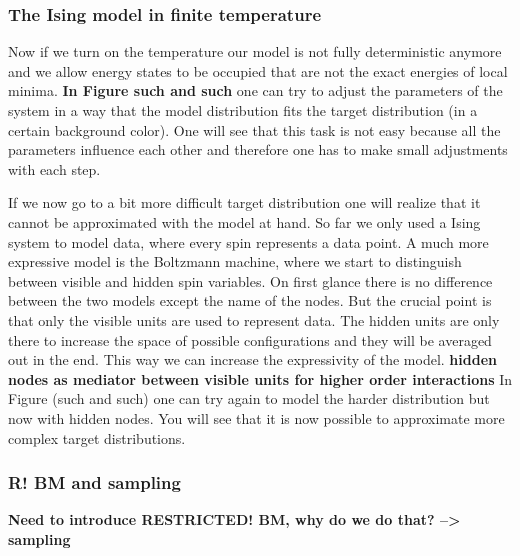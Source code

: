 \documentclass[nofootinbib, superscriptaddress, prl]{revtex4}
\begin{document}
\subsubsection{The Ising model in finite temperature}

Now if we turn on the temperature our model is not fully deterministic anymore and we allow energy states to be occupied that are not the exact energies of local minima.
\textbf{In Figure such and such } one can try to adjust the parameters of the system in a way that the model distribution fits the target distribution (in a certain background color). One will see that this task is not easy because all the parameters influence each other and therefore one has to make small adjustments with each step.

If we now go to a bit more difficult target distribution one will realize that it cannot be approximated with the model at hand. So far we only used a Ising system to model data, where every spin represents a data point. A much more expressive model is the Boltzmann machine, where we start to distinguish between visible and hidden spin variables. On first glance there is no difference between the two models except the name of the nodes. But the crucial point is that only the visible units are used to represent data. The hidden units are only there to increase the space of possible configurations and they will be averaged out in the end. This way we can increase the expressivity of the model. \textbf{hidden nodes as mediator between visible units for higher order interactions} In Figure (such and such) one can try again to model the harder distribution but now with hidden nodes. You will see that it is now possible to approximate more complex target distributions.

\subsubsection{R! BM and sampling}

 \textbf{Need to introduce RESTRICTED! BM, why do we do that? --> sampling}
\end{document}
